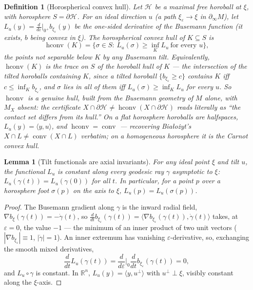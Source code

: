 \documentclass[11pt]{article}
\newtheorem{lemma}[theorem]{Lemma}
\newtheorem{definition}[theorem]{Definition}
\theoremstyle{remark}
\newcommand{\R}{\mathbb{R}}
\newcommand{\X}{X}
\newcommand{\Mx}{M_{\X}}
\newcommand{\Hb}[1]{\mathcal{H}_{#1}}
\newcommand{\conv}{\operatorname{conv}}
\newcommand{\hconv}{\operatorname{hconv}}
\newcommand{\bdry}{\partial_{\infty}}
\begin{document}
\begin{definition}[Horospherical convex hull]\label{def:hconv}
Let $\Hb{}$ be a maximal free horoball at $\xi$, with horosphere
$S=\partial\Hb{}$. For an ideal direction $u$ (a path
$\xi_{\varepsilon}\to\xi$ in $\bdry M$), let
$L_{u}(y)=\frac{d}{d\varepsilon}\big|_{0^{+}}b_{\xi_{\varepsilon}}(y)$
be the one-sided derivative of the Busemann function (it exists, $b$
being convex in $\xi$). The \emph{horospherical convex hull} of
$K\subseteq S$ is
\[
  \hconv(K)=\bigl\{\sigma\in S:\ L_{u}(\sigma)\ge
  \textstyle\inf_{K}L_{u}\ \text{for every }u\bigr\},
\]
the points not separable below $K$ by any Busemann tilt. Equivalently,
$\hconv(K)$ is the trace on $S$ of the \emph{horoball hull} of $K$ ---
the intersection of the tilted horoballs containing $K$, since a tilted
horoball $\{b_{\xi_{\varepsilon}}\ge c\}$ contains $K$ iff
$c\le\inf_{K}b_{\xi_{\varepsilon}}$, and $\sigma$ lies in all of them
iff $L_{u}(\sigma)\ge\inf_{K}L_{u}$ for every $u$. So $\hconv$ is a
genuine \emph{hull}, built from the Busemann geometry of $M$ alone,
with $\Mx$ absent: the certificate $X\cap\partial\Hb{}\neq
\hconv(X\cap\partial\Hb{})$ reads literally as ``the contact set
differs from its hull.'' On a flat horosphere horoballs are
halfspaces, $L_{u}(y)=\langle y,u\rangle$, and $\hconv=\conv$ ---
recovering Bia\l{}o\.zyt's $X\cap L\neq\conv(X\cap L)$ verbatim; on a
homogeneous horosphere it is the Carnot convex hull.
\end{definition}

\begin{lemma}[Tilt functionals are axial invariants]\label{lem:Lu-axial}
For any ideal point $\xi$ and tilt $u$, the functional $L_{u}$ is
constant along every geodesic ray $\gamma$ asymptotic to $\xi$:
$L_{u}(\gamma(t))=L_{u}(\gamma(0))$ for all $t$. In particular, for a
point $p$ over a horosphere foot $\sigma(p)$ on the axis to $\xi$,
$L_{u}(p)=L_{u}(\sigma(p))$.
\end{lemma}

\begin{proof}
The Busemann gradient along $\gamma$ is the inward radial field,
$\nabla b_{\xi}(\gamma(t))=-\dot\gamma(t)$, so
$\frac{d}{dt}b_{\xi_{\varepsilon}}(\gamma(t))=\langle\nabla
b_{\xi_{\varepsilon}}(\gamma(t)),\dot\gamma(t)\rangle$ takes, at
$\varepsilon=0$, the value $-1$ --- the minimum of an inner product of
two unit vectors ($|\nabla b_{\xi_{\varepsilon}}|\equiv1$,
$|\dot\gamma|=1$). An inner extremum has vanishing
$\varepsilon$-derivative, so, exchanging the smooth mixed derivatives,
\[
  \frac{d}{dt}L_{u}(\gamma(t))
  =\frac{d}{d\varepsilon}\Big|_{0}\frac{d}{dt}
  b_{\xi_{\varepsilon}}(\gamma(t))=0,
\]
and $L_{u}\circ\gamma$ is constant. In $\R^{n}$,
$L_{u}(y)=\langle y,u^{\perp}\rangle$ with $u^{\perp}\perp\xi$, visibly
constant along the $\xi$-axis.
\end{proof}
\end{document}
